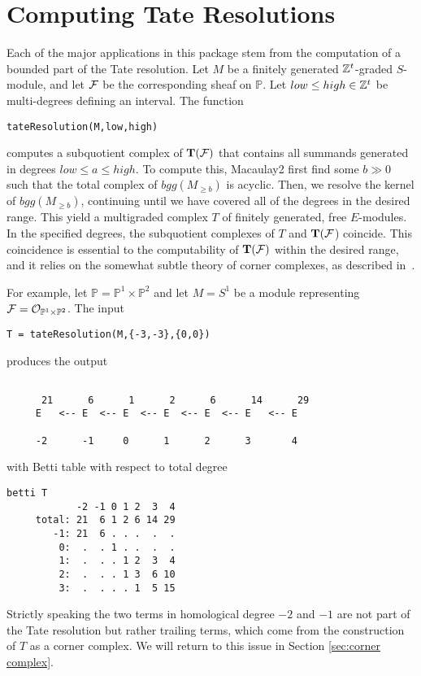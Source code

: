 \documentclass[twoside,12pt, leqno]{amsart}
\def\PP{{\mathbb P}}
\def\bT{{\bf T}}
\begin{document}
\section{Computing Tate Resolutions}\label{sec:tate resolutions}
Each of the major applications in this package stem from the computation of a bounded part of the Tate resolution.
Let $M$ be a finitely generated ${\mathbb Z}^t$-graded $S$-module, and let ${\mathcal F}$ be the 
corresponding sheaf on $\PP$. Let
$low\leq high\in {\mathbb Z}^t$ be multi-degrees defining an interval.  The function
\begin{verbatim}
tateResolution(M,low,high)
\end{verbatim}
computes a subquotient complex of $\bT(\sF)$ that contains all summands generated in degrees $low\leq a \leq  high$.  To compute this, Macaulay2 first find some $b\gg 0$ such that the total complex of $bgg(M_{\geq b})$ is acyclic.  	Then, we resolve the kernel of $bgg(M_{\geq b})$, continuing until we have covered all of the degrees in the desired range.  This yield a multigraded complex $T$ of finitely generated, free $E$-modules.  In the specified degrees, the subquotient complexes of $T$ and $\bT(\sF$) coincide.  This coincidence is essential to the computability of $\bT(\sF)$ within the desired range, and it relies on the somewhat subtle theory of corner complexes, as described in~\cite{EES}.

For example, let $\PP=\PP^1\times \PP^2$ and let $M=S^1$ be a module representing $\sF=\cO_{\PP^1\times \PP^2}$.  The input
\begin{verbatim}
T = tateResolution(M,{-3,-3},{0,0})
\end{verbatim}
produces the output
{\small \begin{verbatim}

      21      6      1      2      6      14      29
     E   <-- E  <-- E  <-- E  <-- E  <-- E   <-- E
                                                  
     -2      -1     0      1      2      3       4
\end{verbatim}}
\noindent
with Betti table with respect to total degree
{\small \begin{verbatim}
betti T
            -2 -1 0 1 2  3  4
     total: 21  6 1 2 6 14 29
        -1: 21  6 . . .  .  .
         0:  .  . 1 . .  .  .
         1:  .  . . 1 2  3  4
         2:  .  . . 1 3  6 10
         3:  .  . . . 1  5 15
\end{verbatim}}
\noindent
Strictly speaking the two terms in homological degree $-2$ and $-1$ are not part of the Tate resolution but rather trailing terms, which come from the construction of $T$ as a corner complex. We will return to this issue in Section \ref{sec:corner complex}.
\end{document}
